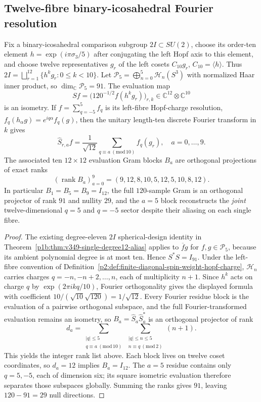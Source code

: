 \documentclass[12pt,a4paper]{article}
\begin{document}
\subsection{Twelve-fibre binary-icosahedral Fourier resolution}
\label{p2d:sec:cc14-hopf-120}

\begin{theorem}
\label{p2d:thm:cc14-hopf-120}
Fix a binary-icosahedral comparison subgroup $2I\subset SU(2)$,
choose its order-ten element $h=\exp(i\pi\sigma_3/5)$ after
conjugating the left Hopf axis to this element, and choose twelve
representatives $g_r$ of the left cosets $C_{10}g_r$,
$C_{10}=\langle h\rangle$.  Thus
$2I=\bigsqcup_{r=1}^{12}\{h^kg_r:0\le k<10\}$.
Let $\mathcal P_5=\bigoplus_{n=0}^{5}\mathcal H_n(S^3)$ with normalized
Haar inner product, so $\dim_\mathbb C\mathcal P_5=91$.
The evaluation map
\[
 Sf=\bigl(120^{-1/2}f(h^kg_r)\bigr)_{r,k}
 \in\mathbb C^{12}\otimes\mathbb C^{10}
\]
is an isometry.  If $f=\sum_{q=-5}^{5}f_q$ is its left-fibre Hopf-charge
resolution, $f_q(h_\alpha g)=e^{iq\alpha}f_q(g)$, then the unitary
length-ten discrete Fourier transform in $k$ gives
\[
 \boxed{\widehat S_{r,a}f=
 \frac1{\sqrt{12}}\sum_{q\equiv a\ (\mathrm{mod}\,10)}f_q(g_r),
 \quad a=0,\ldots,9.}
\]
The associated ten $12\times12$ evaluation Gram blocks $B_a$ are
orthogonal projections of exact ranks
\[
 \boxed{(\operatorname{rank}B_a)_{a=0}^{9}
 =(9,12,8,10,5,12,5,10,8,12).}
\]
In particular $B_1=B_5=B_9=I_{12}$, the full $120$-sample
Gram is an orthogonal projector of rank $91$ and nullity $29$,
and the $a=5$ block reconstructs the \emph{joint} twelve-dimensional
$q=5$ and $q=-5$ sector despite their aliasing on each single fibre.
\end{theorem}
\begin{proof}
The existing degree-eleven $2I$ spherical-design identity in
Theorem~\ref{p1b:thm:v349-single-degree12-alias} applies to
$\overline fg$ for $f,g\in\mathcal P_5$, because its ambient
polynomial degree is at most ten.  Hence $S^*S=I_{91}$.
Under the left-fibre convention of
Definition~\ref{p2:def:finite-diagonal-spin-weight-hopf-charge},
$\mathcal H_n$ carries charges $q=-n,-n+2,\ldots,n$, each of
multiplicity $n+1$.  Since $h^k$ acts on charge $q$ by
$\exp(2\pi ikq/10)$, Fourier orthogonality gives the displayed
formula with coefficient $10/(\sqrt{10}\sqrt{120})=1/\sqrt{12}$.
Every Fourier residue block is the evaluation of a pairwise
orthogonal subspace, and the full Fourier-transformed evaluation
remains an isometry, so $B_a=\widehat S_a\widehat S_a^*$ is an
orthogonal projector of rank
\[
 d_a=\sum_{\substack{|q|\le5\\q\equiv a\ (\mathrm{mod}\,10)}}
 \sum_{\substack{|q|\le n\le5\\n\equiv q\ (\mathrm{mod}\,2)}}(n+1).
\]
This yields the integer rank list above.  Each block lives on twelve
coset coordinates, so $d_a=12$ implies $B_a=I_{12}$.  The
$a=5$ residue contains only $q=5,-5$, each of dimension six;
its square isometric evaluation therefore separates those
subspaces globally.  Summing the ranks gives $91$, leaving
$120-91=29$ null directions.
\end{proof}
\end{document}
